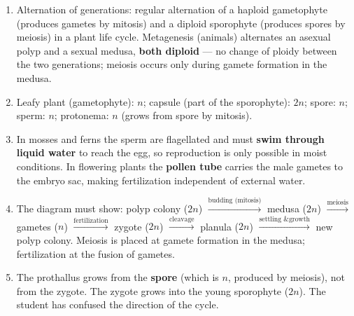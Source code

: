 \documentclass[11pt]{article}
\begin{document}
\begin{corrige}[Exercise 1]
\begin{enumerate}
\item Alternation of generations: regular alternation of a haploid gametophyte (produces gametes by mitosis) and a diploid sporophyte (produces spores by meiosis) in a plant life cycle. Metagenesis (animals) alternates an asexual polyp and a sexual medusa, \textbf{both diploid} — no change of ploidy between the two generations; meiosis occurs only during gamete formation in the medusa.
\item Leafy plant (gametophyte): $n$; capsule (part of the sporophyte): $2n$; spore: $n$; sperm: $n$; protonema: $n$ (grows from spore by mitosis).
\item In mosses and ferns the sperm are flagellated and must \textbf{swim through liquid water} to reach the egg, so reproduction is only possible in moist conditions. In flowering plants the \textbf{pollen tube} carries the male gametes to the embryo sac, making fertilization independent of external water.
\item The diagram must show: polyp colony ($2n$) $\xrightarrow{\text{budding (mitosis)}}$ medusa ($2n$) $\xrightarrow{\text{meiosis}}$ gametes ($n$) $\xrightarrow{\text{fertilization}}$ zygote ($2n$) $\xrightarrow{\text{cleavage}}$ planula ($2n$) $\xrightarrow{\text{settling \& growth}}$ new polyp colony. Meiosis is placed at gamete formation in the medusa; fertilization at the fusion of gametes.
\item The prothallus grows from the \textbf{spore} (which is $n$, produced by meiosis), not from the zygote. The zygote grows into the young sporophyte ($2n$). The student has confused the direction of the cycle.
\end{enumerate}
\end{corrige}
\end{document}

